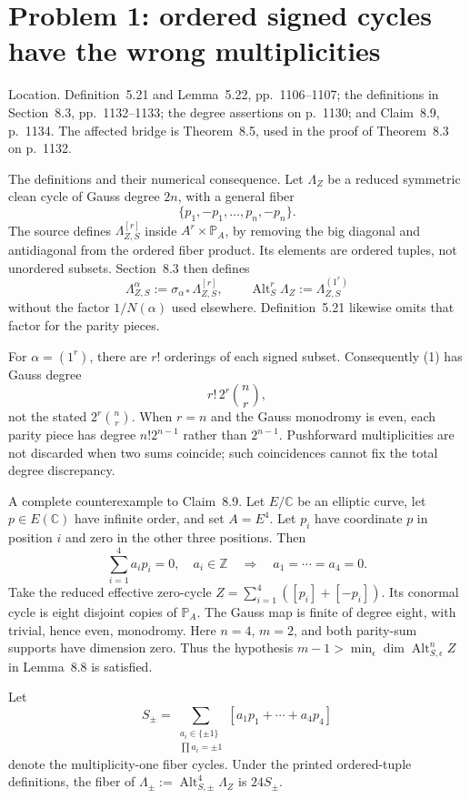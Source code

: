 \documentclass[10pt]{article}
\begin{document}
\section*{Problem 1: ordered signed cycles have the wrong multiplicities}
Location. Definition 5.21 and Lemma 5.22, pp. 1106–1107; the definitions in Section 8.3, pp. 1132–1133; the degree assertions on p. 1130; and Claim 8.9, p. 1134. The affected bridge is Theorem 8.5, used in the proof of Theorem 8.3 on p. 1132.\par
The definitions and their numerical consequence. Let \(\Lambda_Z\) be a reduced symmetric clean cycle of Gauss degree \(2n\), with a general fiber \[\{p_1,-p_1,\ldots,p_n,-p_n\}.\] The source defines \(\Lambda_{Z,S}^{[r]}\) inside \(A^r\times\mathbb P_A\), by removing the big diagonal and antidiagonal from the ordered fiber product. Its elements are ordered tuples, not unordered subsets. Section 8.3 then defines \[\Lambda_{Z,S}^{\alpha}:=\sigma_{\alpha *}\Lambda_{Z,S}^{[r]},
 \qquad
 \operatorname{Alt}_S^r\Lambda_Z:=\Lambda_{Z,S}^{(1^r)}
 \tag{1}\] without the factor \(1/N(\alpha)\) used elsewhere. Definition 5.21 likewise omits that factor for the parity pieces.\par
For \(\alpha=(1^r)\), there are \(r!\) orderings of each signed subset. Consequently (1) has Gauss degree \[r!\,2^r\binom nr,
 \tag{2}\] not the stated \(2^r\binom nr\). When \(r=n\) and the Gauss monodromy is even, each parity piece has degree \(n!2^{n-1}\) rather than \(2^{n-1}\). Pushforward multiplicities are not discarded when two sums coincide; such coincidences cannot fix the total degree discrepancy.\par
A complete counterexample to Claim 8.9. Let \(E/\mathbb C\) be an elliptic curve, let \(p\in E(\mathbb C)\) have infinite order, and set \(A=E^4\). Let \(p_i\) have coordinate \(p\) in position \(i\) and zero in the other three positions. Then \[\sum_{i=1}^4 a_i p_i=0,\quad a_i\in\mathbb Z
 \quad\Longrightarrow\quad a_1=\cdots=a_4=0.\] Take the reduced effective zero-cycle \(Z=\sum_{i=1}^4([p_i]+[-p_i])\). Its conormal cycle is eight disjoint copies of \(\mathbb P_A\). The Gauss map is finite of degree eight, with trivial, hence even, monodromy. Here \(n=4\), \(m=2\), and both parity-sum supports have dimension zero. Thus the hypothesis \(m-1>\min_\epsilon\dim\operatorname{Alt}_{S,\epsilon}^nZ\) in Lemma 8.8 is satisfied.\par
Let \[S_\pm=\sum_{\substack{a_i\in\{\pm1\}\\\prod a_i=\pm1}}
       [a_1p_1+\cdots+a_4p_4]\] denote the multiplicity-one fiber cycles. Under the printed ordered-tuple definitions, the fiber of \(\Lambda_\pm:=\operatorname{Alt}_{S,\pm}^4\Lambda_Z\) is \(24S_\pm\).\par
\end{document}
